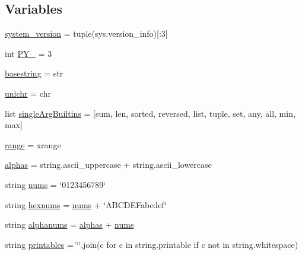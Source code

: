 \subsection*{Variables}
\begin{DoxyCompactItemize}
\item 
\hyperlink{namespacepkg__resources_1_1__vendor_1_1pyparsing_a5368fc0440daa531edb18d17b2dcc1aa}{system\+\_\+version} = tuple(sys.\+version\+\_\+info)\mbox{[}\+:3\mbox{]}
\item 
int \hyperlink{namespacepkg__resources_1_1__vendor_1_1pyparsing_a69f21faa46dc8122f0e0371cee0a0350}{P\+Y\+\_} = 3
\item 
\hyperlink{namespacepkg__resources_1_1__vendor_1_1pyparsing_a75e7d1ecae95b2b3b71c65bab123bfd7}{basestring} = str
\item 
\hyperlink{namespacepkg__resources_1_1__vendor_1_1pyparsing_a5464ed15ef587598d2f52536e4a989de}{unichr} = chr
\item 
list \hyperlink{namespacepkg__resources_1_1__vendor_1_1pyparsing_a017591b581e824ba494ab366d56a1e6c}{single\+Arg\+Builtins} = \mbox{[}sum, len, sorted, reversed, list, tuple, set, any, all, min, max\mbox{]}
\item 
\hyperlink{namespacepkg__resources_1_1__vendor_1_1pyparsing_a82e82236066e7783b082b96c5cb059b4}{range} = xrange
\item 
\hyperlink{namespacepkg__resources_1_1__vendor_1_1pyparsing_a20ad4ed375fe5fc1570c40151eb9cbc5}{alphas} = string.\+ascii\+\_\+uppercase + string.\+ascii\+\_\+lowercase
\item 
string \hyperlink{namespacepkg__resources_1_1__vendor_1_1pyparsing_a6c6517120cc6c9ef6818a9fc8ec194a2}{nums} = \char`\"{}0123456789\char`\"{}
\item 
string \hyperlink{namespacepkg__resources_1_1__vendor_1_1pyparsing_a991e77e8ed852569795a4340d8879010}{hexnums} = \hyperlink{namespacepkg__resources_1_1__vendor_1_1pyparsing_a6c6517120cc6c9ef6818a9fc8ec194a2}{nums} + \char`\"{}A\+B\+C\+D\+E\+Fabcdef\char`\"{}
\item 
string \hyperlink{namespacepkg__resources_1_1__vendor_1_1pyparsing_abd10420c9a41c54b82b281181e0ed109}{alphanums} = \hyperlink{namespacepkg__resources_1_1__vendor_1_1pyparsing_a20ad4ed375fe5fc1570c40151eb9cbc5}{alphas} + \hyperlink{namespacepkg__resources_1_1__vendor_1_1pyparsing_a6c6517120cc6c9ef6818a9fc8ec194a2}{nums}
\item 
string \hyperlink{namespacepkg__resources_1_1__vendor_1_1pyparsing_a4bc6c6b29d45cfc606fe3a2956b160f4}{printables} = \char`\"{}\char`\"{}.join(c for c in string.\+printable if c not in string.\+whitespace)

\end{DoxyCompactItemize}
